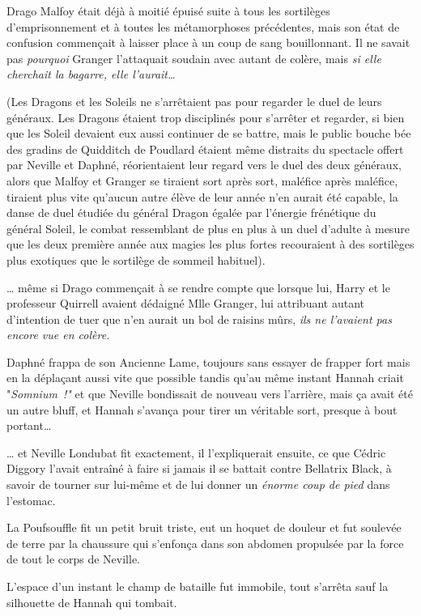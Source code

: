 Drago Malfoy était déjà à moitié épuisé suite à tous les sortilèges d'emprisonnement et à toutes les métamorphoses précédentes, mais son état de confusion commençait à laisser place à un coup de sang bouillonnant. Il ne savait pas \emph{pourquoi} Granger l'attaquait soudain avec autant de colère, mais \emph{si elle cherchait la bagarre, elle l'aurait…}

(Les Dragons et les Soleils ne s'arrêtaient pas pour regarder le duel de leurs généraux. Les Dragons étaient trop disciplinés pour s'arrêter et regarder, si bien que les Soleil devaient eux aussi continuer de se battre, mais le public bouche bée des gradins de Quidditch de Poudlard étaient même distraits du spectacle offert par Neville et Daphné, réorientaient leur regard vers le duel des deux généraux, alors que Malfoy et Granger se tiraient sort après sort, maléfice après maléfice, tiraient plus vite qu'aucun autre élève de leur année n'en aurait été capable, la danse de duel étudiée du général Dragon égalée par l'énergie frénétique du général Soleil, le combat ressemblant de plus en plus à un duel d'adulte à mesure que les deux première année aux magies les plus fortes recouraient à des sortilèges plus exotiques que le sortilège de sommeil habituel).

… même si Drago commençait à se rendre compte que lorsque lui, Harry et le professeur Quirrell avaient dédaigné Mlle Granger, lui attribuant autant d'intention de tuer que n'en aurait un bol de raisins mûrs, \emph{ils ne l'avaient pas encore vue en colère.}

\later

Daphné frappa de son Ancienne Lame, toujours sans essayer de frapper fort mais en la déplaçant aussi vite que possible tandis qu'au même instant Hannah criait "\emph{Somnium~!"} et que Neville bondissait de nouveau vers l'arrière, mais ça avait été un autre bluff, et Hannah s'avança pour tirer un véritable sort, presque à bout portant…

… et Neville Londubat fit exactement, il l'expliquerait ensuite, ce que Cédric Diggory l'avait entraîné à faire si jamais il se battait contre Bellatrix Black, à savoir de tourner sur lui-même et de lui donner un \emph{énorme coup de pied} dans l'estomac.

La Poufsouffle fit un petit bruit triste, eut un hoquet de douleur et fut soulevée de terre par la chaussure qui s'enfonça dans son abdomen propulsée par la force de tout le corps de Neville.

L'espace d'un instant le champ de bataille fut immobile, tout s'arrêta sauf la silhouette de Hannah qui tombait.

